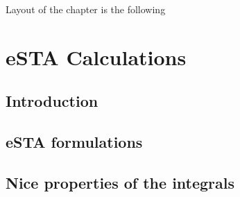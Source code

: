 Layout of the chapter is the following
\section{eSTA Calculations}

\subsection{Introduction} %


\subsection{eSTA formulations}


\subsection{Nice properties of the integrals} %

